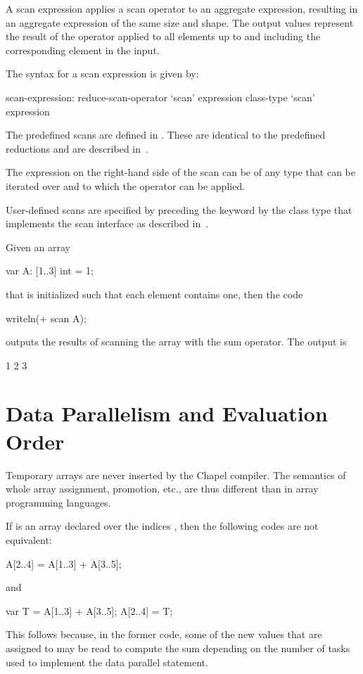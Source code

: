 A scan expression applies a scan operator to an aggregate expression,
resulting in an aggregate expression of the same size and shape.  The
output values represent the result of the operator applied to all
elements up to and including the corresponding element in the input.

The syntax for a scan expression is given by:
\begin{syntax}
scan-expression:
  reduce-scan-operator `scan' expression
  class-type `scan' expression
\end{syntax}

The predefined scans are defined in .  These
are identical to the predefined reductions and are described
in~.

The expression on the right-hand side of the scan can be of any type
that can be iterated over and to which the operator can be applied.

User-defined scans are specified by preceding the keyword 
by the class type that implements the scan interface as described
in~.

%
%
\begin{example}
Given an array
\begin{chapel}
var A: [1..3] int = 1;
\end{chapel}
that is initialized such that each element contains one, then the code
\begin{chapel}
writeln(+ scan A);
\end{chapel}
outputs the results of scanning the array with the sum operator.  The
output is
\begin{chapelprintoutput}
1 2 3
\end{chapelprintoutput}
\end{example}

\section{Data Parallelism and Evaluation Order}

Temporary arrays are never inserted by the Chapel compiler.  The
semantics of whole array assignment, promotion, etc., are thus
different than in array programming languages.

%
%
\begin{example}
If  is an array declared over the indices , then
the following codes are not equivalent:
\begin{chapel}
A[2..4] = A[1..3] + A[3..5];
\end{chapel}
and
\begin{chapel}
var T = A[1..3] + A[3..5];
A[2..4] = T;
\end{chapel}
This follows because, in the former code, some of the new values that
are assigned to  may be read to compute the sum depending on
the number of tasks used to implement the data parallel statement.
\end{example}

